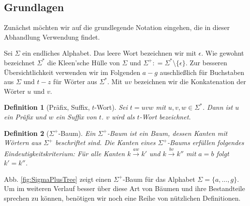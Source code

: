 \documentclass[12pt]{report}
\newtheorem{definition}{Definition}
\newcommand{\coloneqq}{\mathrel{\mathop:}=}
\begin{document}
\subsection{Grundlagen}
\label{sec:Grundlagen}

Zunächst möchten wir auf die grundlegende Notation eingehen, die in dieser Abhandlung Verwendung findet.

Sei $\Sigma$ ein endliches Alphabet. Das leere Wort bezeichnen wir mit $\epsilon$. Wie gewohnt bezeichnet $\Sigma^*$ die Kleen'sche Hülle von $\Sigma$ und $\Sigma^+ \coloneqq \Sigma^* \setminus \{\epsilon\}$. Zur besseren Übersichtlichkeit verwenden wir im Folgenden $a - g$ auschließlich für Buchstaben aus $\Sigma$ und $t - z$ für Wörter aus $\Sigma^*$. Mit $uv$ bezeichnen wir die Konkatenation der Wörter $u$ und $v$.

\begin{definition}[Präfix, Suffix, $t$-Wort]
Sei $t = uvw$ mit $u, v, w \in \Sigma^*$. Dann ist $u$ ein Präfix und $w$ ein Suffix von $t$. $v$ wird als $t$-Wort bezeichnet.
\end{definition}

\begin{definition}[$\Sigma^+$-Baum]
Ein $\Sigma^+$-Baum ist ein Baum, dessen Kanten mit Wörtern aus $\Sigma^+$ beschriftet sind. Die Kanten eines $\Sigma^+$-Baums erfüllen folgendes Eindeutigkeitskriterium: Für alle Kanten $k \xrightarrow{aw} k'$ und $k \xrightarrow{bv} k''$ mit $a = b$ folgt $k' = k''$.
\label{def:SigmaPlusBaum}
\end{definition}

Abb. \ref{fig:SigmaPlusTree} zeigt einen $\Sigma^+$-Baum für das Alphabet $\Sigma = \{a, \dots, g \}$. Um im weiteren Verlauf besser über diese Art von Bäumen und ihre Bestandteile sprechen zu können, benötigen wir noch eine Reihe von nützlichen Definitionen.
\end{document}
